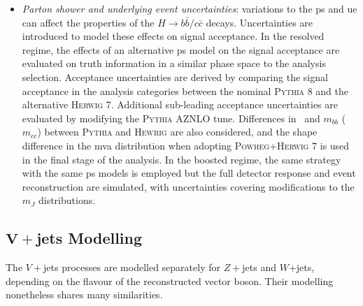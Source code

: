 \begin{itemize}
    \item \textit{Parton shower and underlying event uncertainties}: variations to the \gls{ps} and \gls{ue} can affect the properties of the $H \rightarrow b\bar{b} / c\bar{c}$ decays. Uncertainties are introduced to model these effects on signal acceptance. In the resolved regime, the effects of an alternative \gls{ps} model on the signal acceptance are evaluated on truth information in a similar phase space to the analysis selection. Acceptance uncertainties are derived by comparing the signal acceptance in the analysis categories between the nominal \textsc{Pythia} 8 and the alternative \textsc{Herwig} 7. Additional sub-leading acceptance uncertainties are evaluated by modifying the \textsc{Pythia} AZNLO tune. Differences in \ptv\ and $m_{bb}$ ($m_{cc}$) between \textsc{Pythia} and \textsc{Hewrig} are also considered, and the shape difference in the \gls{mva} distribution when adopting \textsc{Powheg}+\textsc{Herwig} 7 is used in the final stage of the analysis. In the boosted regime, the same strategy with the same \gls{ps} models is employed but the full detector response and event reconstruction are simulated, with uncertainties covering modifications to the $m_J$ distributions.
\end{itemize}

\subsection[$V+$jets Modelling]{$\boldsymbol{V+}$jets Modelling}\label{sec-modVjet} %
The $V+$jets processes are modelled separately for $Z+$jets and $W$+jets, depending on the flavour of the reconstructed vector boson. Their modelling nonetheless shares many similarities.


